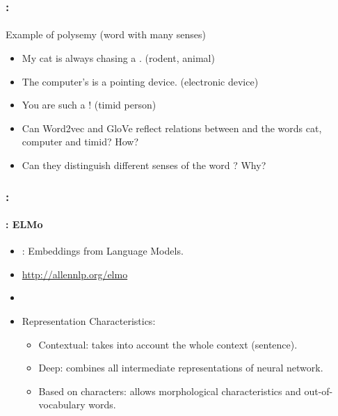 \documentclass[xcolor=table]{beamer}
\begin{document}
\begin{frame}
	\frametitle{\insertshortsubtitle: \insertsection}
	\framesubtitle{\insertsubsection}

	\begin{exampleblock}{Example of polysemy (word with many senses)}
		\begin{itemize}
			\item My cat is always chasing a . (rodent, animal)
			\item The computer's  is a pointing device. (electronic device)
			\item You are such a ! (timid person)
		\end{itemize}
	\end{exampleblock}
	
	\begin{itemize}
		\item Can Word2vec and GloVe reflect relations between  and the words cat, computer and timid? How?
		\item Can they distinguish different senses of the word ? Why?
	\end{itemize}

\end{frame}

\begin{frame}
	\frametitle{\insertshortsubtitle: \insertsection}
	\framesubtitle{\insertsubsection: ELMo}

	\begin{minipage}{.65\textwidth}
	\begin{itemize}
		\item {}: Embeddings from Language Models.
		\item \url{http://allennlp.org/elmo}
		\item \cite{2018-peters-al}
		\item Representation Characteristics:
		\begin{itemize}
			\item Contextual: takes into account the whole context (sentence).
			\item Deep: combines all intermediate representations of neural network.
			\item Based on characters: allows morphological characteristics and out-of-vocabulary words.
		\end{itemize}
	\end{itemize}
	\end{minipage}
	\begin{minipage}{.33\textwidth}
		\vspace{1.8cm}
	\end{minipage}
	
\end{frame}
\end{document}
